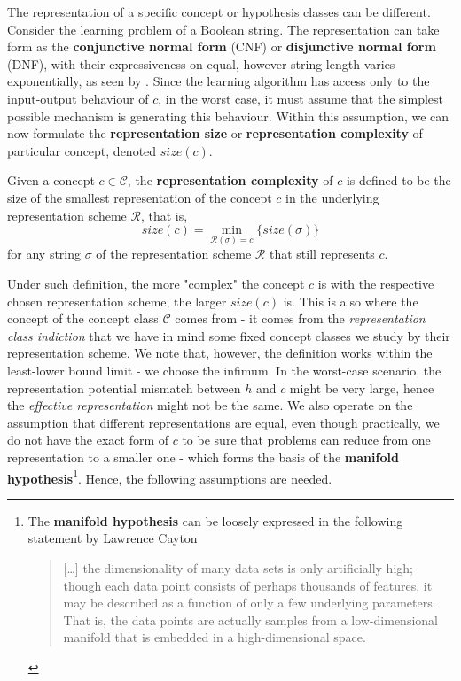 The representation of a specific concept or hypothesis classes can be different. Consider the learning problem of a Boolean string. The representation can take form as the \textbf{conjunctive normal form} (CNF) or \textbf{disjunctive normal form} (DNF), with their expressiveness on equal, however string length varies exponentially, as seen by \cite{Wegener1987,MiltersenRadhakrishnanWegener2005,DarwicheMarquis2002}. Since the learning algorithm has access only to the input-output behaviour of $c$, in the worst case, it must assume that the simplest possible mechanism is generating this behaviour. Within this assumption, we can now formulate the \textbf{representation size} or \textbf{representation complexity} of particular concept, denoted $size(c)$. 
\begin{definition}
    Given a concept $c\in\mathcal{C}$, the \textbf{representation complexity} of $c$ is defined to be the size of the smallest representation of the concept $c$ in the underlying representation scheme $\mathcal{R}$, that is, 
    \begin{equation*}
    size(c) = \min_{\mathcal{R}(\sigma)=c}\{size(\sigma)\}
\end{equation*}
for any string $\sigma$ of the representation scheme $\mathcal{R}$ that still represents $c$.
\end{definition}
Under such definition, the more "complex" the concept $c$ is with the respective chosen representation scheme, the larger $size(c)$ is. This is also where the concept of the concept class $\mathcal{C}$ comes from - it comes from the \textit{representation class indiction} that we have in mind some fixed concept classes we study by their representation scheme. We note that, however, the definition works within the least-lower bound limit - we choose the infimum. In the worst-case scenario, the representation potential mismatch between $h$ and $c$ might be very large, hence the \textit{effective representation} might not be the same. We also operate on the assumption that different representations are equal, even though practically, we do not have the exact form of $c$ to be sure that problems can reduce from one representation to a smaller one - which forms the basis of the \textbf{manifold hypothesis}\footnote{The \textbf{manifold hypothesis} can be loosely expressed in the following statement by Lawrence Cayton \begin{quote}
  [\dots] the dimensionality of many data sets is only artificially high; though each data point consists of perhaps thousands of features, it may be described as a function of only a few underlying parameters. That is, the data points are actually samples from a low-dimensional manifold that is embedded in a high-dimensional space. 
\end{quote}}. Hence, the following assumptions are needed. 

